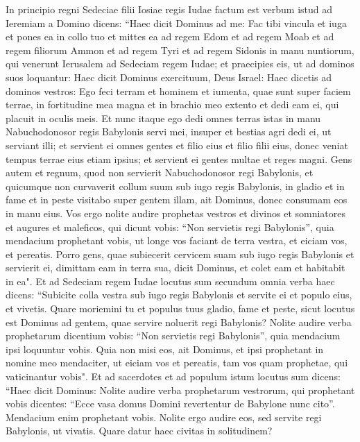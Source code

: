\begin{biblechapter}  
\verse In principio regni Sedeciae filii Iosiae regis Iudae factum est verbum istud ad Ieremiam a Domino dicens: 
\verse “Haec dicit Dominus ad me: Fac tibi vincula et iuga et pones ea in collo tuo 
\verse et mittes ea ad regem Edom et ad regem Moab et ad regem filiorum Ammon et ad regem Tyri et ad regem Sidonis in manu nuntiorum, qui venerunt Ierusalem ad Sedeciam regem Iudae; 
\verse et praecipies eis, ut ad dominos suos loquantur: Haec dicit Dominus exercituum, Deus Israel: Haec dicetis ad dominos vestros: 
\verse Ego feci terram et hominem et iumenta, quae sunt super faciem terrae, in fortitudine mea magna et in brachio meo extento et dedi eam ei, qui placuit in oculis meis. 
\verse Et nunc itaque ego dedi omnes terras istas in manu Nabuchodonosor regis Babylonis servi mei, insuper et bestias agri dedi ei, ut serviant illi; 
\verse et servient ei omnes gentes et filio eius et filio filii eius, donec veniat tempus terrae eius etiam ipsius; et servient ei gentes multae et reges magni. 
\verse Gens autem et regnum, quod non servierit Nabuchodonosor regi Babylonis, et quicumque non curvaverit collum suum sub iugo regis Babylonis, in gladio et in fame et in peste visitabo super gentem illam, ait Dominus, donec consumam eos in manu eius.  
\verse Vos ergo nolite audire prophetas vestros et divinos et somniatores et augures et maleficos, qui dicunt vobis: “Non servietis regi Babylonis”, 
\verse quia mendacium prophetant vobis, ut longe vos faciant de terra vestra, et eiciam vos, et pereatis. 
\verse Porro gens, quae subiecerit cervicem suam sub iugo regis Babylonis et servierit ei, dimittam eam in terra sua, dicit Dominus, et colet eam et habitabit in ea". 
\verse Et ad Sedeciam regem Iudae locutus sum secundum omnia verba haec dicens: “Subicite colla vestra sub iugo regis Babylonis et servite ei et populo eius, et vivetis. 
\verse Quare moriemini tu et populus tuus gladio, fame et peste, sicut locutus est Dominus ad gentem, quae servire noluerit regi Babylonis? 
\verse Nolite audire verba prophetarum dicentium vobis: “Non servietis regi Babylonis”, quia mendacium ipsi loquuntur vobis. 
\verse Quia non misi eos, ait Dominus, et ipsi prophetant in nomine meo mendaciter, ut eiciam vos et pereatis, tam vos quam prophetae, qui vaticinantur vobis". 
\verse Et ad sacerdotes et ad populum istum locutus sum dicens: “Haec dicit Dominus: Nolite audire verba prophetarum vestrorum, qui prophetant vobis dicentes: “Ecce vasa domus Domini revertentur de Babylone nunc cito”. Mendacium enim prophetant vobis. 
\verse Nolite ergo audire eos, sed servite regi Babylonis, ut vivatis. Quare datur haec civitas in solitudinem? 

\end{biblechapter}
